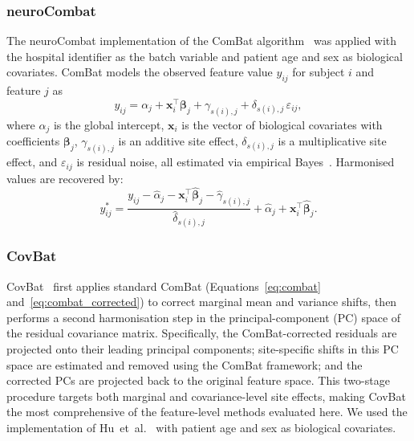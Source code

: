 \documentclass[preprint,12pt]{elsarticle}
\begin{document}
\subsubsection{neuroCombat}
\label{subsubsec:neurocombat}

The neuroCombat implementation of the ComBat
algorithm~\cite{johnson2007adjusting,fortin2017harmonization} was
applied with the hospital identifier as the batch variable and patient
age and sex as biological covariates.
ComBat models the observed feature value $y_{ij}$ for subject $i$ and
feature $j$ as
\begin{equation}
  y_{ij} = \alpha_j + \mathbf{x}_i^{\top}\boldsymbol{\beta}_j
           + \gamma_{s(i),j} + \delta_{s(i),j}\,\varepsilon_{ij},
  \label{eq:combat}
\end{equation}
where $\alpha_j$ is the global intercept, $\mathbf{x}_i$ is the
vector of biological covariates with coefficients
$\boldsymbol{\beta}_j$, $\gamma_{s(i),j}$ is an additive site
effect, $\delta_{s(i),j}$ is a multiplicative site effect, and
$\varepsilon_{ij}$ is residual noise, all estimated via empirical
Bayes~\cite{johnson2007adjusting}.
Harmonised values are recovered by:
\begin{equation}
  y^*_{ij} = \frac{y_{ij} - \hat{\alpha}_j
             - \mathbf{x}_i^{\top}\hat{\boldsymbol{\beta}}_j
             - \hat{\gamma}_{s(i),j}}{\hat{\delta}_{s(i),j}}
             + \hat{\alpha}_j
             + \mathbf{x}_i^{\top}\hat{\boldsymbol{\beta}}_j.
  \label{eq:combat_corrected}
\end{equation}


\subsubsection{CovBat}
\label{subsubsec:covbat}

CovBat~\cite{hu2023image} first applies standard ComBat
(Equations~\ref{eq:combat} and~\ref{eq:combat_corrected}) to correct
marginal mean and variance shifts, then performs a second
harmonisation step in the principal-component (PC) space of the
residual covariance matrix.
Specifically, the ComBat-corrected residuals are projected onto their
leading principal components; site-specific shifts in this PC space
are estimated and removed using the ComBat framework; and the
corrected PCs are projected back to the original feature space.
This two-stage procedure targets both marginal and covariance-level
site effects, making CovBat the most comprehensive of the
feature-level methods evaluated here.
We used the implementation of Hu~et~al.~\cite{hu2023image} with
patient age and sex as biological covariates.
\end{document}
